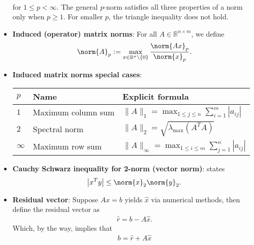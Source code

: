 \documentclass{report}
\begin{document}
\begin{itemize}
\begin{align*}
            \end{align*}
            for $1 \leq p < \infty $. The general $p$-norm satisfies all three properties of a norm only when $p \geq 1$. For smaller $p$, the triangle inequality does not hold.
        \item \textbf{Induced (operator) matrix norms}: For all $A\in \mathbb{R}^{n\times m}$, we define
            \begin{align*}
                \norm{A}_{p} := \max_{x\in\mathbb{R}^{n} \setminus \{0\}} \frac{\norm{Ax}_{p}}{\norm{x}_{p}}
           .\end{align*}
         \item \textbf{Induced matrix norms special cases}:
            \begin{center}
                \begin{tabular}{p{1cm}|p{5cm}|p{5cm}}
                    \toprule
                    $p$ & \textbf{Name} & \textbf{Explicit formula} \\
                    \midrule
                    $1$ & Maximum column sum &
                    $\displaystyle \|A\|_{1} = \max_{1 \leq j \leq n} \sum_{i=1}^{m} |a_{ij}|$ \\[3ex]
                    $2$ & Spectral norm &
                    $\displaystyle \|A\|_{2} = \sqrt{\lambda_{\max}(A^{T}A)}$ \\[3ex]
                    $\infty$ & Maximum row sum &
                    $\displaystyle \|A\|_{\infty} = \max_{1 \leq i \leq m} \sum_{j=1}^{n} |a_{ij}|$ \\
                    \bottomrule
                \end{tabular}
            \end{center}
        \item \textbf{Cauchy Schwarz inequality for 2-norm (vector norm)}: states
            \begin{align*}
                \left\lvert x^{T}y \right\rvert \leq \norm{x}_{2}\norm{y}_{2} 
            .\end{align*}
        \item \textbf{Residual vector}: Suppose $Ax=b$ yields $\hat{x}$ via numerical methods, then define the residual vector as
            \begin{align*}
                \hat{r} = b-A\hat{x}
            .\end{align*}
            Which, by the way, implies that
            \begin{align*}
                b = \hat{r} + A\hat{x}

\end{align*}
\end{itemize}
\end{document}
